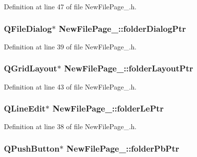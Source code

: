 Definition at line 47 of file New\-File\-Page\-\_.\-h.

\hypertarget{class_new_file_page__4_a4d3e4936410b7c135b1150b7840bc411}{
\subsubsection[{folder\-Dialog\-Ptr}]{\setlength{\rightskip}{0pt plus 5cm}Q\-File\-Dialog$\ast$ New\-File\-Page\-\_\-::folder\-Dialog\-Ptr\hspace{0.3cm}{\ttfamily [private]}}}\label{class_new_file_page__4_a4d3e4936410b7c135b1150b7840bc411}


Definition at line 39 of file New\-File\-Page\-\_.\-h.

\hypertarget{class_new_file_page__4_ae35f4a21e38b5d0849b580bc45b1af6d}{
\subsubsection[{folder\-Layout\-Ptr}]{\setlength{\rightskip}{0pt plus 5cm}Q\-Grid\-Layout$\ast$ New\-File\-Page\-\_\-::folder\-Layout\-Ptr\hspace{0.3cm}{\ttfamily [private]}}}\label{class_new_file_page__4_ae35f4a21e38b5d0849b580bc45b1af6d}


Definition at line 43 of file New\-File\-Page\-\_.\-h.

\hypertarget{class_new_file_page__4_aa502f56ce180d904bbb70be9409d7ef6}{
\subsubsection[{folder\-Le\-Ptr}]{\setlength{\rightskip}{0pt plus 5cm}Q\-Line\-Edit$\ast$ New\-File\-Page\-\_\-::folder\-Le\-Ptr\hspace{0.3cm}{\ttfamily [private]}}}\label{class_new_file_page__4_aa502f56ce180d904bbb70be9409d7ef6}


Definition at line 38 of file New\-File\-Page\-\_.\-h.

\hypertarget{class_new_file_page__4_ac1b396af8e82371912cbfa03250bd820}{
\subsubsection[{folder\-Pb\-Ptr}]{\setlength{\rightskip}{0pt plus 5cm}Q\-Push\-Button$\ast$ New\-File\-Page\-\_\-::folder\-Pb\-Ptr\hspace{0.3cm}{\ttfamily [private]}}}\label{class_new_file_page__4_ac1b396af8e82371912cbfa03250bd820}


